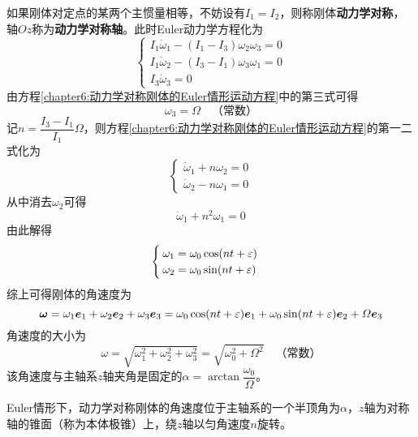 如果刚体对定点的某两个主惯量相等，不妨设有$I_1=I_2$，则称刚体{\bf 动力学对称}，轴$Oz$称为{\bf 动力学对称轴}。此时Euler动力学方程化为
\begin{equation}
	\begin{cases}
		I_1 \dot{\omega}_1 - (I_1-I_3)\omega_2 \omega_3 = 0 \\
		I_1 \dot{\omega}_2 - (I_3-I_1)\omega_3 \omega_1 = 0 \\
		I_3 \dot{\omega}_3 = 0
	\end{cases}
	\label{chapter6:动力学对称刚体的Euler情形运动方程}
\end{equation}
由方程\eqref{chapter6:动力学对称刚体的Euler情形运动方程}中的第三式可得
\begin{equation}
	\omega_3 = \varOmega \quad \text{（常数）}
	\label{对称Euler陀螺的解-1}
\end{equation}
记$n = \dfrac{I_3-I_1}{I_1} \varOmega$，则方程\eqref{chapter6:动力学对称刚体的Euler情形运动方程}的第一二式化为
\begin{equation*}
	\begin{cases}
		\dot{\omega}_1 + n\omega_2 = 0 \\
		\dot{\omega}_2 - n\omega_1 = 0
	\end{cases}
\end{equation*}
从中消去$\omega_2$可得
\begin{equation*}
	\ddot{\omega}_1 + n^2\omega_1 = 0
\end{equation*}
由此解得
\begin{equation}
\begin{cases}
	\omega_1 = \omega_0 \cos(nt+\varepsilon) \\
	\omega_2 = \omega_0 \sin(nt+\varepsilon)
\end{cases}
\label{对称Euler陀螺的解-2}
\end{equation}
综上可得刚体的角速度为
\begin{equation}
	\boldsymbol{\omega} = \omega_1 \boldsymbol{e}_1 + \omega_2 \boldsymbol{e}_2 + \omega_3 \boldsymbol{e}_3 = \omega_0 \cos(nt+\varepsilon) \boldsymbol{e}_1 + \omega_0 \sin(nt+\varepsilon) \boldsymbol{e}_2 + \varOmega \boldsymbol{e}_3
	\label{对称Euler陀螺的解-3}
\end{equation}
角速度的大小为
\begin{equation*}
	\omega = \sqrt{\omega_1^2 +\omega_2^2 +\omega_3^2} = \sqrt{\omega_0^2 + \varOmega^2}\quad \text{（常数）}
\end{equation*}
该角速度与主轴系$z$轴夹角是固定的$\alpha = \arctan \dfrac{\omega_0}{\varOmega}$。

Euler情形下，动力学对称刚体的角速度位于主轴系的一个半顶角为$\alpha$，$z$轴为对称轴的锥面（称为{\heiti 本体极锥}）上，绕$z$轴以匀角速度$n$旋转。

